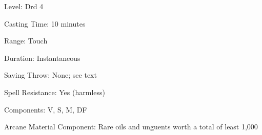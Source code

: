 
\begin{description*}
\item[Level:] Drd 4
\item[Casting Time:] 10 minutes
\item[Range:] Touch
\item[Duration:] Instantaneous
\item[Saving Throw:] None; see text
\item[Spell Resistance:] Yes (harmless)
\item[Components:] V, S, M, DF
\item[Arcane Material Component:] Rare oils and unguents worth a total of least 1,000
\end{description*}

